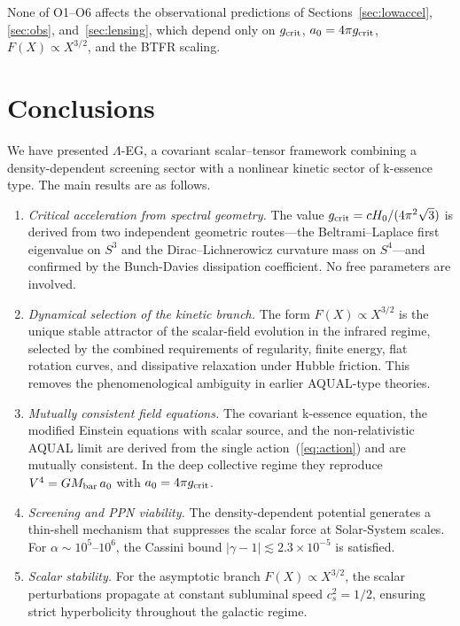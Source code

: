\documentclass[11pt,a4paper]{article}
\begin{document}
None of O1--O6 affects the observational predictions of Sections~\ref{sec:lowaccel},
\ref{sec:obs}, and~\ref{sec:lensing}, which depend only on $g_{\rm crit}$,
$a_0 = 4\pi g_{\rm crit}$, $F(X)\propto X^{3/2}$, and the BTFR scaling.

\section{Conclusions}
\label{sec:conclusions}

We have presented $\Lambda$-EG, a covariant scalar--tensor framework combining a
density-dependent screening sector with a nonlinear kinetic sector of k-essence type.
The main results are as follows.

\begin{enumerate}
\item \textit{Critical acceleration from spectral geometry.} The value
  $g_{\rm crit} = cH_0/(4\pi^2\sqrt{3})$ is derived from two independent geometric
  routes---the Beltrami--Laplace first eigenvalue on $S^3$ and the Dirac--Lichnerowicz
  curvature mass on $S^4$---and confirmed by the Bunch-Davies dissipation coefficient.
  No free parameters are involved.

\item \textit{Dynamical selection of the kinetic branch.} The form $F(X)\propto X^{3/2}$
  is the unique stable attractor of the scalar-field evolution in the infrared regime,
  selected by the combined requirements of regularity, finite energy, flat rotation curves,
  and dissipative relaxation under Hubble friction. This removes the phenomenological
  ambiguity in earlier AQUAL-type theories.

\item \textit{Mutually consistent field equations.} The covariant k-essence equation,
  the modified Einstein equations with scalar source, and the non-relativistic AQUAL
  limit are derived from the single action~(\ref{eq:action}) and are mutually
  consistent. In the deep collective regime they reproduce $V^4 = GM_{\rm bar}\,a_0$ with $a_0 = 4\pi g_{\rm crit}$.

\item \textit{Screening and PPN viability.} The density-dependent potential generates
  a thin-shell mechanism that suppresses the scalar force at Solar-System scales.
  For $\alpha\sim10^5$--$10^6$, the Cassini bound $|\gamma-1|\lesssim2.3\times10^{-5}$
  is satisfied.

\item \textit{Scalar stability.} For the asymptotic branch $F(X)\propto X^{3/2}$,
  the scalar perturbations propagate at constant subluminal speed $c_s^2 = 1/2$,
  ensuring strict hyperbolicity throughout the galactic regime.


\end{enumerate}
\end{document}
